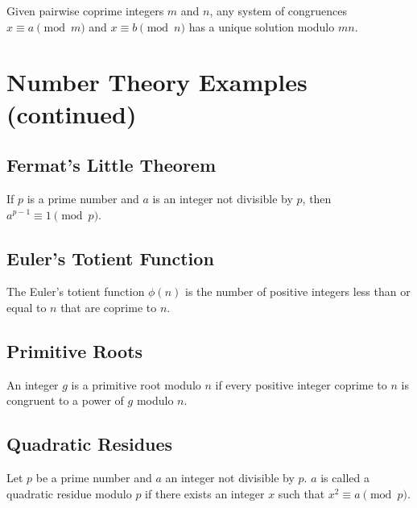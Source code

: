 \documentclass{article}
\begin{document}
\begin{theorem}
Given pairwise coprime integers $m$ and $n$, any system of congruences $x \equiv a \pmod{m}$ and $x \equiv b \pmod{n}$ has a unique solution modulo $mn$.
\end{theorem}

\section{Number Theory Examples (continued)}

\subsection{Fermat's Little Theorem}

\begin{theorem}
If $p$ is a prime number and $a$ is an integer not divisible by $p$, then $a^{p-1} \equiv 1 \pmod{p}$.
\end{theorem}

\subsection{Euler's Totient Function}

\begin{definition}
The Euler's totient function $\phi(n)$ is the number of positive integers less than or equal to $n$ that are coprime to $n$.
\end{definition}

\subsection{Primitive Roots}

\begin{definition}
An integer $g$ is a primitive root modulo $n$ if every positive integer coprime to $n$ is congruent to a power of $g$ modulo $n$.
\end{definition}

\subsection{Quadratic Residues}

\begin{definition}
Let $p$ be a prime number and $a$ an integer not divisible by $p$. $a$ is called a quadratic residue modulo $p$ if there exists an integer $x$ such that $x^2 \equiv a \pmod{p}$.
\end{definition}
\end{document}
